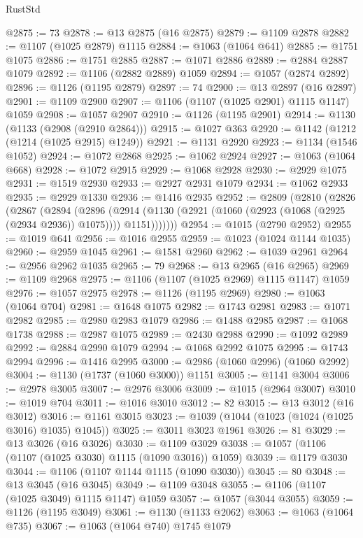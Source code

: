 \begin{lexlean}{RustStd}
\begin{coremodule}
@2875 := 73
@2878 := @13 @2875 (@16 @2875)
@2879 := @1109 @2878
@2882 := @1107 (@1025 @2879) @1115
@2884 := @1063 (@1064 @641)
@2885 := @1751 @1075
@2886 := @1751 @2885
@2887 := @1071 @2886
@2889 := @2884 @2887 @1079
@2892 := @1106 (@2882 @2889) @1059
@2894 := @1057 (@2874 @2892)
@2896 := @1126 (@1195 @2879)
@2897 := 74
@2900 := @13 @2897 (@16 @2897)
@2901 := @1109 @2900
@2907 := @1106 (@1107 (@1025 @2901) @1115 @1147) @1059
@2908 := @1057 @2907
@2910 := @1126 (@1195 @2901)
@2914 := @1130 (@1133 (@2908 (@2910 @2864)))
@2915 := @1027 @363
@2920 := @1142 (@1212 (@1214 (@1025 @2915) @1249))
@2921 := @1131 @2920
@2923 := @1134 (@1546 @1052)
@2924 := @1072 @2868
@2925 := @1062 @2924
@2927 := @1063 (@1064 @668)
@2928 := @1072 @2915
@2929 := @1068 @2928
@2930 := @2929 @1075
@2931 := @1519 @2930
@2933 := @2927 @2931 @1079
@2934 := @1062 @2933
@2935 := @2929 @1330
@2936 := @1416 @2935
@2952 := @2809
    (@2810
      (@2826
        (@2867
          (@2894
            (@2896
              (@2914 (@1130 (@2921 (@1060 (@2923 (@1068 (@2925 (@2934 @2936)) @1075)))) @1151)))))))
@2954 := @1015 (@2790 @2952)
@2955 := @1019 @641
@2956 := @1016 @2955
@2959 := @1023 (@1024 @1144 @1035)
@2960 := @2959 @1045
@2961 := @1581 @2960
@2962 := @1039 @2961
@2964 := @2956 @2962 @1035
@2965 := 79
@2968 := @13 @2965 (@16 @2965)
@2969 := @1109 @2968
@2975 := @1106 (@1107 (@1025 @2969) @1115 @1147) @1059
@2976 := @1057 @2975
@2978 := @1126 (@1195 @2969)
@2980 := @1063 (@1064 @704)
@2981 := @1648 @1075
@2982 := @1743 @2981
@2983 := @1071 @2982
@2985 := @2980 @2983 @1079
@2986 := @1488 @2985
@2987 := @1068 @1738
@2988 := @2987 @1075
@2989 := @2430 @2988
@2990 := @1092 @2989
@2992 := @2884 @2990 @1079
@2994 := @1068 @2992 @1075
@2995 := @1743 @2994
@2996 := @1416 @2995
@3000 := @2986 (@1060 @2996) (@1060 @2992)
@3004 := @1130 (@1737 (@1060 @3000)) @1151
@3005 := @1141 @3004
@3006 := @2978 @3005
@3007 := @2976 @3006
@3009 := @1015 (@2964 @3007)
@3010 := @1019 @704
@3011 := @1016 @3010
@3012 := 82
@3015 := @13 @3012 (@16 @3012)
@3016 := @1161 @3015
@3023 := @1039 (@1044 (@1023 (@1024 (@1025 @3016) @1035) @1045))
@3025 := @3011 @3023 @1961
@3026 := 81
@3029 := @13 @3026 (@16 @3026)
@3030 := @1109 @3029
@3038 := @1057 (@1106 (@1107 (@1025 @3030) @1115 (@1090 @3016)) @1059)
@3039 := @1179 @3030
@3044 := @1106 (@1107 @1144 @1115 (@1090 @3030))
@3045 := 80
@3048 := @13 @3045 (@16 @3045)
@3049 := @1109 @3048
@3055 := @1106 (@1107 (@1025 @3049) @1115 @1147) @1059
@3057 := @1057 (@3044 @3055)
@3059 := @1126 (@1195 @3049)
@3061 := @1130 (@1133 @2062)
@3063 := @1063 (@1064 @735)
@3067 := @1063 (@1064 @740) @1745 @1079

\end{coremodule}
\end{lexlean}
